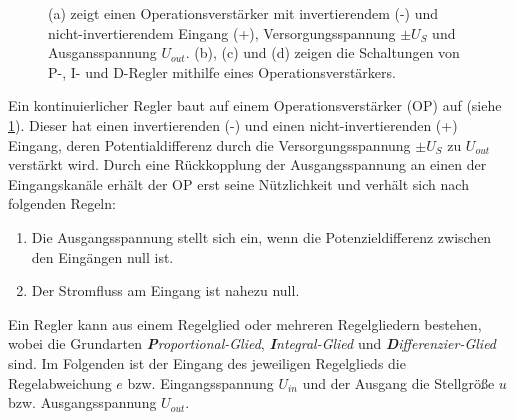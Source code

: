 \begin{figure}[h]
{{{	    	}
	}}
	\caption[Operationsverstärker, Regler]{(a) zeigt einen Operationsverstärker
	mit invertierendem (-) und nicht-invertierendem
	Eingang (+), Versorgungsspannung $\pm U_S$ und
	Ausgansspannung $U_{out}$. (b), (c) und (d) zeigen die Schaltungen von
	P-, I- und D-Regler mithilfe eines
	Operationsverstärkers.}\label{fig:operationsverstaerker}
\end{figure}
Ein kontinuierlicher Regler baut auf einem Operationsverstärker (OP) auf (siehe
\ref{fig:operationsverstaerker}). Dieser
hat einen invertierenden (-) und einen nicht-invertierenden (+) Eingang, deren Potentialdifferenz durch die
Versorgungsspannung $\pm U_S$ zu $U_{out}$ verstärkt wird. Durch eine
Rückkopplung der Ausgangsspannung an einen der Eingangskanäle erhält der OP erst
seine Nützlichkeit und verhält sich nach folgenden Regeln:
\begin{enumerate}
       \item Die Ausgangsspannung stellt sich ein, wenn die Potenzieldifferenz
       zwischen den Eingängen null ist.
       \item Der Stromfluss am Eingang ist nahezu null.
\end{enumerate}
Ein Regler kann aus einem Regelglied oder mehreren Regelgliedern bestehen, wobei
die Grundarten \textit{\textbf{P}roportional-Glied}, \textit{\textbf{I}ntegral-Glied} und
\textit{\textbf{D}ifferenzier-Glied} sind. Im Folgenden ist der Eingang des
jeweiligen Regelglieds die Regelabweichung $e$ bzw. Eingangsspannung $U_{in}$
und der Ausgang die Stellgröße $u$ bzw. Ausgangsspannung $U_{out}$.

